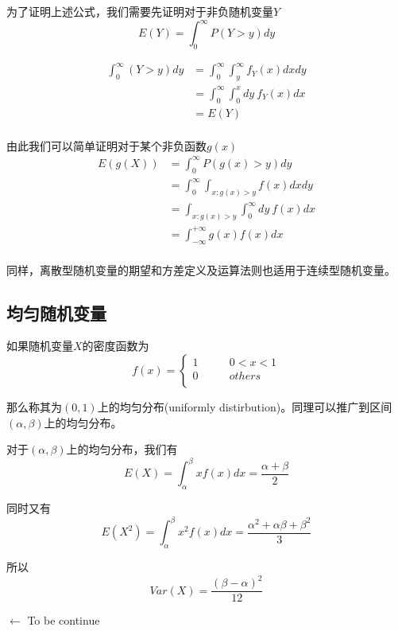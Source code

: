 \documentclass[UTF8]{ctexart}
\begin{document}
为了证明上述公式，我们需要先证明对于非负随机变量$Y$
$$E(Y)=\int_{0}^{\infty }P(Y>y)dy $$

$$\begin{aligned}
\int_{0}^{\infty }(Y>y)dy&=\int_{0}^{\infty }\int_{y}^{\infty }f_{Y}(x)dxdy\\
&=\int_{0}^{\infty } \int_{0}^{x}dy~f_{Y}(x)dx \\
&=E(Y) \\
\end{aligned} $$

由此我们可以简单证明对于某个非负函数$g(x)$
$$\begin{aligned}
E(g(X))&=\int_{0}^{\infty }P(g(x)>y)dy\\
&=\int_{0}^{\infty }\int_{x:g(x)>y}f(x)dxdy\\
&=\int_{x:g(x)>y} \int_{0}^{\infty }dy~f(x)dx\\
&=\int_{-\infty }^{+\infty }g(x)f(x)dx\\
\end{aligned} $$

同样，离散型随机变量的期望和方差定义及运算法则也适用于连续型随机变量。

\subsection{均匀随机变量}

如果随机变量$X$的密度函数为
$$f(x)=\left \{
\begin{array}{ll}
1&\qquad 0<x<1\\
0&\qquad others\\
\end{array}
\right.
$$

那么称其为$(0,1)$上的均匀分布(uniformly distirbution)。同理可以推广到区间$(\alpha ,\beta )$上的均匀分布。

对于$(\alpha ,\beta )$上的均匀分布，我们有
$$E(X)=\int_{\alpha }^{\beta }xf(x)dx=\frac{\alpha +\beta }{2}$$

同时又有
$$E(X^{2})=\int_{\alpha }^{\beta }x^{2}f(x)dx=\frac{\alpha^{2}+\alpha \beta +\beta^{2}}{3} $$

所以
$$Var(X)=\frac{(\beta -\alpha )^{2}}{12} $$





$\gets$ To be continue
\end{document}
